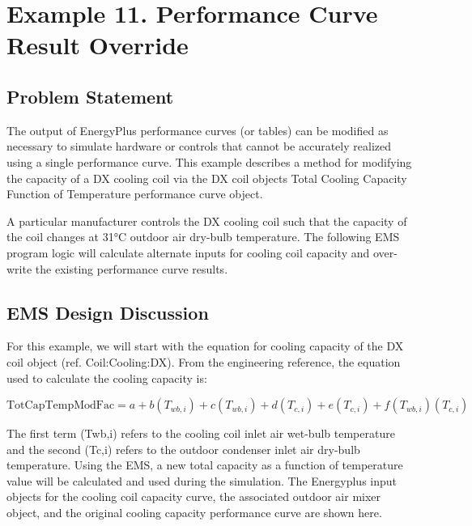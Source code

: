 \section{Example 11. Performance Curve Result Override}\label{example-11.-performance-curve-result-override}

\subsection{Problem Statement}\label{problem-statement-001}

The output of EnergyPlus performance curves (or tables) can be modified as necessary to simulate hardware or controls that cannot be accurately realized using a single performance curve. This example describes a method for modifying the capacity of a DX cooling coil via the DX coil objects Total Cooling Capacity Function of Temperature performance curve object.

A particular manufacturer controls the DX cooling coil such that the capacity of the coil changes at 31°C outdoor air dry-bulb temperature. The following EMS program logic will calculate alternate inputs for cooling coil capacity and over-write the existing performance curve results.

\subsection{EMS Design Discussion}\label{ems-design-discussion-001}

For this example, we will start with the equation for cooling capacity of the DX coil object (ref. Coil:Cooling:DX). From the engineering reference, the equation used to calculate the cooling capacity is:

\begin{equation}
\text{TotCapTempModFac} = a + b \left( T_{wb,i} \right) + c \left( T_{wb,i} \right) + d \left( T_{c,i} \right) + e \left( T_{c,i} \right) + f \left( T_{wb,i} \right)\left( T_{c,i} \right)
\end{equation}

The first term (Twb,i) refers to the cooling coil inlet air wet-bulb temperature and the second (Tc,i) refers to the outdoor condenser inlet air dry-bulb temperature. Using the EMS, a new total capacity as a function of temperature value will be calculated and used during the simulation. The Energyplus input objects for the cooling coil capacity curve, the associated outdoor air mixer object, and the original cooling capacity performance curve are shown here.

